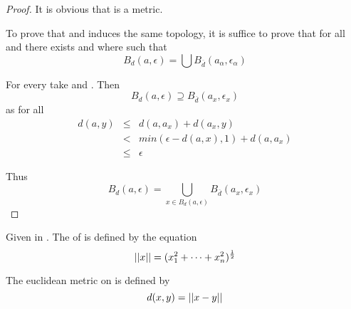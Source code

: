 \begin{proof}
      It is obvious that  is a metric.

      To prove that  and  induces the same topology, it is suffice to prove that for all  and  there exists  and \mt{
            \{\epsilon_{\alpha}\}
      } where  such that
      \begin{equation*}
            B_{d}(a,\epsilon) = \bigcup B_{\overline{d}}(a_{\alpha},\epsilon_{\alpha})
      \end{equation*}

      For every  take  and . Then
      \begin{equation*}
            B_{d}(a,\epsilon) \supseteq B_{\overline{d}}(a_{x},\epsilon_{x})
      \end{equation*}
      as for all 
      \begin{eqnarray*}
            d(a,y) &\leq& d(a,a_{x}) + d(a_{x},y) \\
            &<& min(\epsilon - d(a,x),1) + d(a,a_{x}) \\
            &\leq& \epsilon
      \end{eqnarray*}

      Thus
      \begin{equation*}
            B_{d}(a,\epsilon) = \bigcup_{
                  x \in B_{d}(a,\epsilon)
            } B_{\overline{d}}(a_{x},\epsilon_{x})
      \end{equation*}
\end{proof}

\begin{definition}[norm]\label{def:Norm}
      Given  in . The  of  is defined by the equation
      \begin{equation*}
            ||x|| = (
                  x_{1}^{2}+\dots+x_{n}^{2}
            )^{\frac{1}{2}}
      \end{equation*}
\end{definition}

\begin{definition}\label{def:EuclideanMetric}
      The euclidean metric  on  is defined by
      \begin{equation*}
            d(x,y) = ||x-y||
      \end{equation*}
\end{definition}

